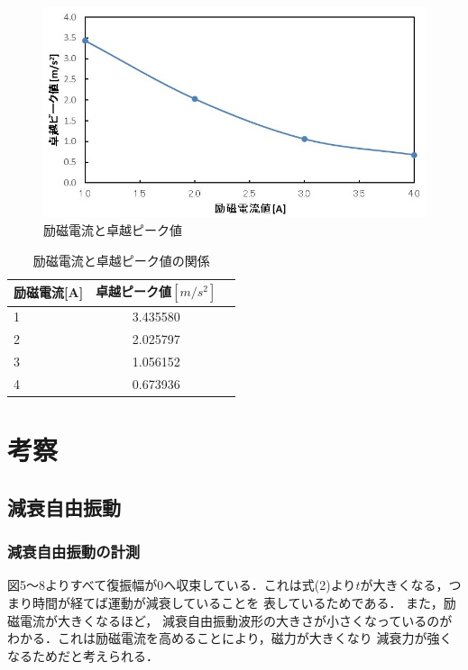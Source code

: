 \documentclass[a4paper,10.5pt]{jsarticle}
\begin{document}
\begin{figure}[h]
  \centering
  \includegraphics[width=14cm]{11.png}
  \caption{励磁電流と卓越ピーク値}
\end{figure}
\newpage
\begin{table}[h]
  \centering
  \caption{励磁電流と卓越ピーク値の関係}
  \begin{tabular}{l|c|r}
    励磁電流[A]&卓越ピーク値$[m/s^2]$\\\hline\hline
      1&3.435580 \\ \hline
      2&2.025797  \\
      3&1.056152  \\
      4&0.673936  \\\hline
  \end{tabular}
\end{table}

\section{考察}
\subsection{減衰自由振動}
\subsubsection{減衰自由振動の計測}
図5〜8よりすべて復振幅が0へ収束している．これは式(2)より$t$が大きくなる，つまり時間が経てば運動が減衰していることを
表しているためである．
また，励磁電流が大きくなるほど，
減衰自由振動波形の大きさが小さくなっているのがわかる．これは励磁電流を高めることにより，磁力が大きくなり
減衰力が強くなるためだと考えられる．
\end{document}
